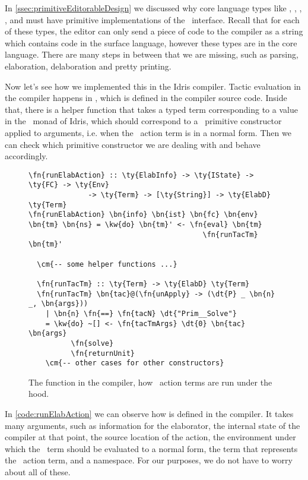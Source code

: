 In \autoref{ssec:primitiveEditorableDesign} we discussed why core language
types like , , , , and
 must have primitive implementations of the
\Editorable\ interface. Recall that for each of these types, the editor can
only send a piece of code to the compiler as a string which contains code in
the surface language, however these types are in the core language. There are
many steps in between that we are missing, such as parsing, elaboration,
delaboration and pretty printing.

Now let's see how we implemented this in the Idris compiler. Tactic evaluation
in the compiler happens in , which is defined in the compiler
source code. Inside that, there is a helper function  that takes a
typed term corresponding to a value in the \Elab\ monad of Idris, which should
correspond to a \Elab\ primitive constructor applied to arguments, i.e. when
the \Elab\ action term is in a normal form. Then we can check which primitive
constructor we are dealing with and behave accordingly.

\begin{figure}[ht]
\caption{The  function in the compiler, how \Elab\ action terms are run under the hood.}
\label{code:runElabAction}
\begin{Verbatim}[framesep=2mm, label=\footnotesize{\normalfont{Haskell}}, labelposition=topline]
\fn{runElabAction} :: \ty{ElabInfo} -> \ty{IState} -> \ty{FC} -> \ty{Env}
              -> \ty{Term} -> [\ty{String}] -> \ty{ElabD} \ty{Term}
\fn{runElabAction} \bn{info} \bn{ist} \bn{fc} \bn{env} \bn{tm} \bn{ns} = \kw{do} \bn{tm}' <- \fn{eval} \bn{tm}
                                         \fn{runTacTm} \bn{tm}'

  \cm{-- some helper functions ...}

  \fn{runTacTm} :: \ty{Term} -> \ty{ElabD} \ty{Term}
  \fn{runTacTm} \bn{tac}@(\fn{unApply} -> (\dt{P} _ \bn{n} _, \bn{args}))
    | \bn{n} \fn{==} \fn{tacN} \dt{"Prim__Solve"}
    = \kw{do} ~[] <- \fn{tacTmArgs} \dt{0} \bn{tac} \bn{args}
          \fn{solve}
          \fn{returnUnit}
    \cm{-- other cases for other constructors}
\end{Verbatim}
\end{figure}

In \autoref{code:runElabAction} we can observe how  is
defined in the compiler.
It takes many arguments, such as information for the elaborator, the internal
state of the compiler at that point, the source location of the action, the
environment under which the \Elab\ term should be evaluated to a normal form, the
term that represents the \Elab\ action term, and a namespace.  For our purposes,
we do not have to worry about all of these.

